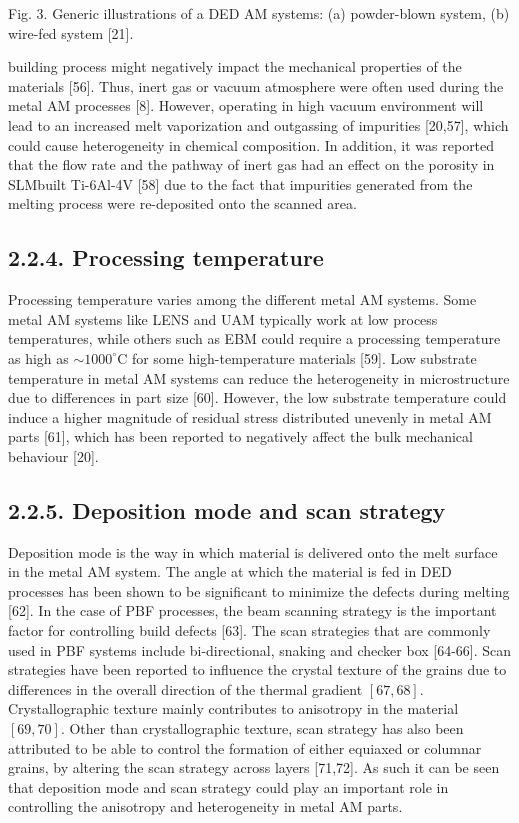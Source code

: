 \documentclass[10pt]{article}
\begin{document}
Fig. 3. Generic illustrations of a DED AM systems: (a) powder-blown system, (b) wire-fed system [21].

building process might negatively impact the mechanical properties of the materials [56]. Thus, inert gas or vacuum atmosphere were often used during the metal AM processes [8]. However, operating in high vacuum environment will lead to an increased melt vaporization and outgassing of impurities [20,57], which could cause heterogeneity in chemical composition. In addition, it was reported that the flow rate and the pathway of inert gas had an effect on the porosity in SLMbuilt Ti-6Al-4V [58] due to the fact that impurities generated from the melting process were re-deposited onto the scanned area.

\subsection*{2.2.4. Processing temperature}
Processing temperature varies among the different metal AM systems. Some metal AM systems like LENS and UAM typically work at low process temperatures, while others such as EBM could require a processing temperature as high as $\sim 1000^{\circ} \mathrm{C}$ for some high-temperature materials [59]. Low substrate temperature in metal AM systems can reduce the heterogeneity in microstructure due to differences in part size [60]. However, the low substrate temperature could induce a higher magnitude of residual stress distributed unevenly in metal AM parts [61], which has been reported to negatively affect the bulk mechanical behaviour [20].

\subsection*{2.2.5. Deposition mode and scan strategy}
Deposition mode is the way in which material is delivered onto the melt surface in the metal AM system. The angle at which the material is fed in DED processes has been shown to be significant to minimize the defects during melting [62]. In the case of PBF processes, the beam scanning strategy is the important factor for controlling build defects [63]. The scan strategies that are commonly used in PBF systems include bi-directional, snaking and checker box [64-66]. Scan strategies have been reported to influence the crystal texture of the grains due to differences in the overall direction of the thermal gradient $[67,68]$. Crystallographic texture mainly contributes to anisotropy in the material $[69,70]$. Other than crystallographic texture, scan strategy has also been attributed to be able to control the formation of either equiaxed or columnar grains, by altering the scan strategy across layers [71,72]. As such it can be seen that deposition mode and scan strategy could play an important role in controlling the anisotropy and heterogeneity in metal AM parts.
\end{document}
